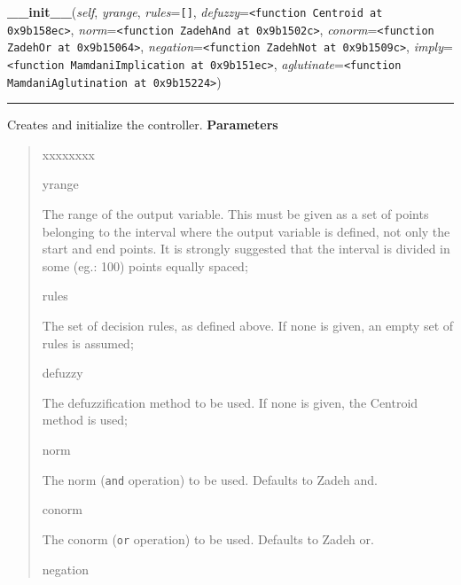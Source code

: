     \vspace{0.5ex}

\hspace{.8\funcindent}\begin{boxedminipage}{\funcwidth}

    \raggedright \textbf{\_\_init\_\_}(\textit{self}, \textit{yrange}, \textit{rules}={\tt \texttt{[}\texttt{]}}, \textit{defuzzy}={\tt {\textless}function Centroid at 0x9b158ec{\textgreater}}, \textit{norm}={\tt {\textless}function ZadehAnd at 0x9b1502c{\textgreater}}, \textit{conorm}={\tt {\textless}function ZadehOr at 0x9b15064{\textgreater}}, \textit{negation}={\tt {\textless}function ZadehNot at 0x9b1509c{\textgreater}}, \textit{imply}={\tt {\textless}function MamdaniImplication at 0x9b151ec{\textgreater}}, \textit{aglutinate}={\tt {\textless}function MamdaniAglutination at 0x9b15224{\textgreater}})

    \vspace{-1.5ex}

    \rule{\textwidth}{0.5\fboxrule}
\setlength{\parskip}{2ex}

Creates and initialize the controller.
\setlength{\parskip}{1ex}
      \textbf{Parameters}
      \vspace{-1ex}

      \begin{quote}
        \begin{Ventry}{xxxxxxxx}

          \item[yrange]


The range of the output variable. This must be given as a set of
points belonging to the interval where the output variable is
defined, not only the start and end points. It is strongly suggested
that the interval is divided in some (eg.: 100) points equally
spaced;
          \item[rules]


The set of decision rules, as defined above. If none is given, an
empty set of rules is assumed;
          \item[defuzzy]


The defuzzification method to be used. If none is given, the
Centroid method is used;
          \item[norm]


The norm (\texttt{and} operation) to be used. Defaults to Zadeh and.
          \item[conorm]


The conorm (\texttt{or} operation) to be used. Defaults to Zadeh or.
          \item[negation]



\end{Ventry}
\end{quote}
\end{boxedminipage}
